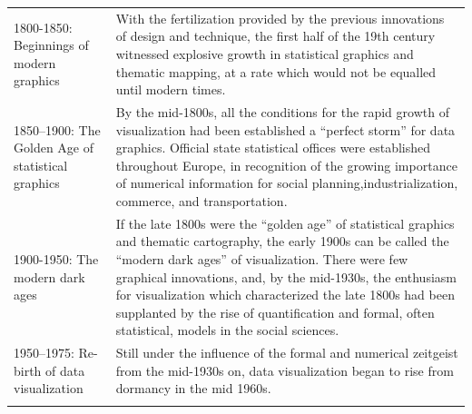 \documentclass[]{book}
\theoremstyle{definition}
\theoremstyle{definition}
\theoremstyle{definition}
\theoremstyle{remark}
\begin{document}
\begin{longtable}[]{@{}ll@{}}
\begin{minipage}[t]{0.16\columnwidth}
1800-1850: Beginnings of modern graphics\strut
\end{minipage} & \begin{minipage}[t]{0.78\columnwidth}\raggedright\strut
With the fertilization provided by the previous innovations of design
and technique, the first half of the 19th century witnessed explosive
growth in statistical graphics and thematic mapping, at a rate which
would not be equalled until modern times.\strut
\end{minipage}\tabularnewline
\begin{minipage}[t]{0.16\columnwidth}\raggedright\strut
1850--1900: The Golden Age of statistical graphics\strut
\end{minipage} & \begin{minipage}[t]{0.78\columnwidth}\raggedright\strut
By the mid-1800s, all the conditions for the rapid growth of
visualization had been established a ``perfect storm'' for data
graphics. Official state statistical offices were established throughout
Europe, in recognition of the growing importance of numerical
information for social planning,industrialization, commerce, and
transportation.\strut
\end{minipage}\tabularnewline
\begin{minipage}[t]{0.16\columnwidth}\raggedright\strut
1900-1950: The modern dark ages\strut
\end{minipage} & \begin{minipage}[t]{0.78\columnwidth}\raggedright\strut
If the late 1800s were the ``golden age'' of statistical graphics and
thematic cartography, the early 1900s can be called the ``modern dark
ages'' of visualization. There were few graphical innovations, and, by
the mid-1930s, the enthusiasm for visualization which characterized the
late 1800s had been supplanted by the rise of quantification and formal,
often statistical, models in the social sciences.\strut
\end{minipage}\tabularnewline
\begin{minipage}[t]{0.16\columnwidth}\raggedright\strut
1950--1975: Re-birth of data visualization\strut
\end{minipage} & \begin{minipage}[t]{0.78\columnwidth}\raggedright\strut
Still under the influence of the formal and numerical zeitgeist from the
mid-1930s on, data visualization began to rise from dormancy in the mid
1960s.\strut
\end{minipage}\tabularnewline
\begin{minipage}[t]{0.16\columnwidth}\raggedright\strut

\end{minipage}
\end{longtable}
\end{document}

